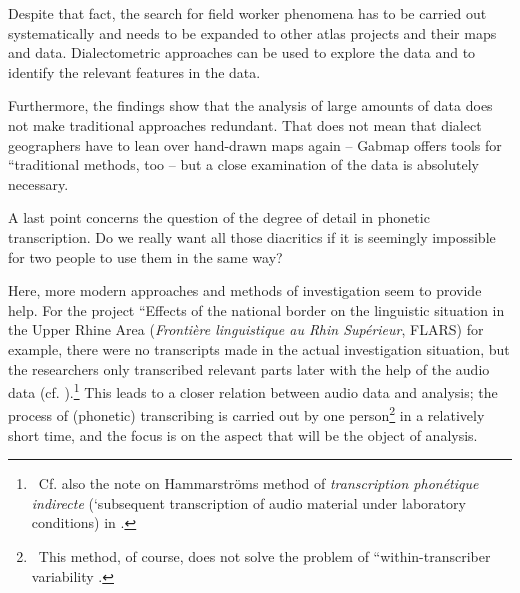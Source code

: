 \documentclass[output=paper]{LSP/langsci}
\begin{document}
Despite that fact, the search for field worker phenomena has to be carried out systematically and needs to be expanded to other atlas projects and their maps and data.  Dialectometric approaches can be used to explore the data and to identify the relevant features in the data.

Furthermore, the findings show that the analysis of large amounts of data does not make traditional approaches redundant. That does not mean that dialect geographers have to lean over hand-drawn maps again – Gabmap offers tools for ``traditional{\textquotedbl} methods, too – but a close examination of the data is absolutely necessary.

A last point concerns the question of the degree of detail in phonetic transcription. Do we really want all those diacritics if it is seemingly impossible for two people to use them in the same way?

Here, more modern approaches and methods of investigation seem to provide help. For the project ``Effects of the national border on the linguistic situation in the Upper Rhine Area{\textquotedbl} (\textit{Frontière linguistique au Rhin Supérieur}, FLARS) for example, there were no transcripts made in the actual investigation situation, but the researchers only transcribed relevant parts later with the help of the audio data (cf. \citealt{auer_auswirkungen_2015}).\footnote{\ Cf. also the note on Hammarström{\textquotesingle}s method of \textit{transcription phonétique indirecte} (`subsequent transcription of audio material under laboratory conditions{\textquotesingle}) in \citet[73]{hotzenkocherle_einfuhrung_1962}.} This leads to a closer relation between audio data and analysis; the process of (phonetic) transcribing is carried out by one person\footnote{\ This method, of course, does not solve the problem of ``within-transcriber variability{\textquotedbl} \citep[258]{kerswill_limits_1990}.} in a relatively short time, and the focus is on the aspect that will be the object of analysis.

\printbibliography[heading=subbibliography,notkeyword=this]
\end{document}
